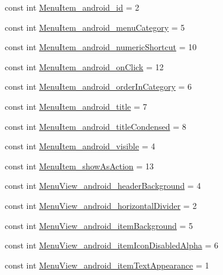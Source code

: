 \begin{CompactItemize}
\item 
const int \hyperlink{class__2doo_1_1_droid_1_1_resource_1_1_styleable_cbea3a659be08ab9119c03c8565e6317}{MenuItem\_\-android\_\-id} = 2
\item 
const int \hyperlink{class__2doo_1_1_droid_1_1_resource_1_1_styleable_da0cc72723a69a3eb4ac47e711d58713}{MenuItem\_\-android\_\-menuCategory} = 5
\item 
const int \hyperlink{class__2doo_1_1_droid_1_1_resource_1_1_styleable_29ce707eee99edb474550e0194bec851}{MenuItem\_\-android\_\-numericShortcut} = 10
\item 
const int \hyperlink{class__2doo_1_1_droid_1_1_resource_1_1_styleable_dea17974f037db1635db2fb345baec06}{MenuItem\_\-android\_\-onClick} = 12
\item 
const int \hyperlink{class__2doo_1_1_droid_1_1_resource_1_1_styleable_e0dd6b38c49a2851471d5dd676d0bcfb}{MenuItem\_\-android\_\-orderInCategory} = 6
\item 
const int \hyperlink{class__2doo_1_1_droid_1_1_resource_1_1_styleable_fdc89a33409137698b7f274da6a3ac9b}{MenuItem\_\-android\_\-title} = 7
\item 
const int \hyperlink{class__2doo_1_1_droid_1_1_resource_1_1_styleable_c11d77f52cd0175b55257354323f64f8}{MenuItem\_\-android\_\-titleCondensed} = 8
\item 
const int \hyperlink{class__2doo_1_1_droid_1_1_resource_1_1_styleable_8c7d0d0a577a05e407e0f275ede51a57}{MenuItem\_\-android\_\-visible} = 4
\item 
const int \hyperlink{class__2doo_1_1_droid_1_1_resource_1_1_styleable_b97655cb588df3a23ef6aa98b8fe1926}{MenuItem\_\-showAsAction} = 13
\item 
const int \hyperlink{class__2doo_1_1_droid_1_1_resource_1_1_styleable_6db4bab13ff50ee34955695cb32a55bc}{MenuView\_\-android\_\-headerBackground} = 4
\item 
const int \hyperlink{class__2doo_1_1_droid_1_1_resource_1_1_styleable_43bdc250bdd7ed8b04f64b19098fd0fb}{MenuView\_\-android\_\-horizontalDivider} = 2
\item 
const int \hyperlink{class__2doo_1_1_droid_1_1_resource_1_1_styleable_d49194d1c4cd06aeedd26d662e792b02}{MenuView\_\-android\_\-itemBackground} = 5
\item 
const int \hyperlink{class__2doo_1_1_droid_1_1_resource_1_1_styleable_10a0c87d66f6bb4992dbdc360131a997}{MenuView\_\-android\_\-itemIconDisabledAlpha} = 6
\item 
const int \hyperlink{class__2doo_1_1_droid_1_1_resource_1_1_styleable_68c6e7937b2a94baad3707b2fb077689}{MenuView\_\-android\_\-itemTextAppearance} = 1

\end{CompactItemize}
